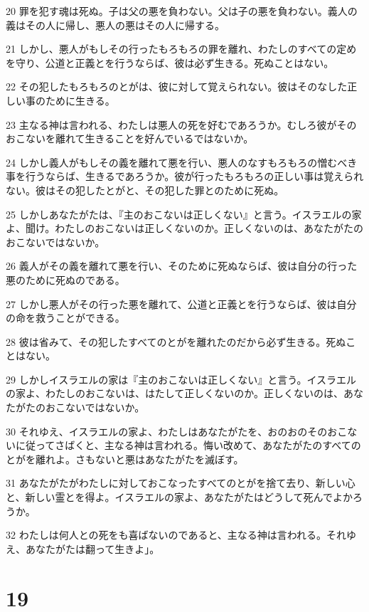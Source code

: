 \par 20 罪を犯す魂は死ぬ。子は父の悪を負わない。父は子の悪を負わない。義人の義はその人に帰し、悪人の悪はその人に帰する。
\par 21 しかし、悪人がもしその行ったもろもろの罪を離れ、わたしのすべての定めを守り、公道と正義とを行うならば、彼は必ず生きる。死ぬことはない。
\par 22 その犯したもろもろのとがは、彼に対して覚えられない。彼はそのなした正しい事のために生きる。
\par 23 主なる神は言われる、わたしは悪人の死を好むであろうか。むしろ彼がそのおこないを離れて生きることを好んでいるではないか。
\par 24 しかし義人がもしその義を離れて悪を行い、悪人のなすもろもろの憎むべき事を行うならば、生きるであろうか。彼が行ったもろもろの正しい事は覚えられない。彼はその犯したとがと、その犯した罪とのために死ぬ。
\par 25 しかしあなたがたは、『主のおこないは正しくない』と言う。イスラエルの家よ、聞け。わたしのおこないは正しくないのか。正しくないのは、あなたがたのおこないではないか。
\par 26 義人がその義を離れて悪を行い、そのために死ぬならば、彼は自分の行った悪のために死ぬのである。
\par 27 しかし悪人がその行った悪を離れて、公道と正義とを行うならば、彼は自分の命を救うことができる。
\par 28 彼は省みて、その犯したすべてのとがを離れたのだから必ず生きる。死ぬことはない。
\par 29 しかしイスラエルの家は『主のおこないは正しくない』と言う。イスラエルの家よ、わたしのおこないは、はたして正しくないのか。正しくないのは、あなたがたのおこないではないか。
\par 30 それゆえ、イスラエルの家よ、わたしはあなたがたを、おのおのそのおこないに従ってさばくと、主なる神は言われる。悔い改めて、あなたがたのすべてのとがを離れよ。さもないと悪はあなたがたを滅ぼす。
\par 31 あなたがたがわたしに対しておこなったすべてのとがを捨て去り、新しい心と、新しい霊とを得よ。イスラエルの家よ、あなたがたはどうして死んでよかろうか。
\par 32 わたしは何人との死をも喜ばないのであると、主なる神は言われる。それゆえ、あなたがたは翻って生きよ」。

\chapter{19}


